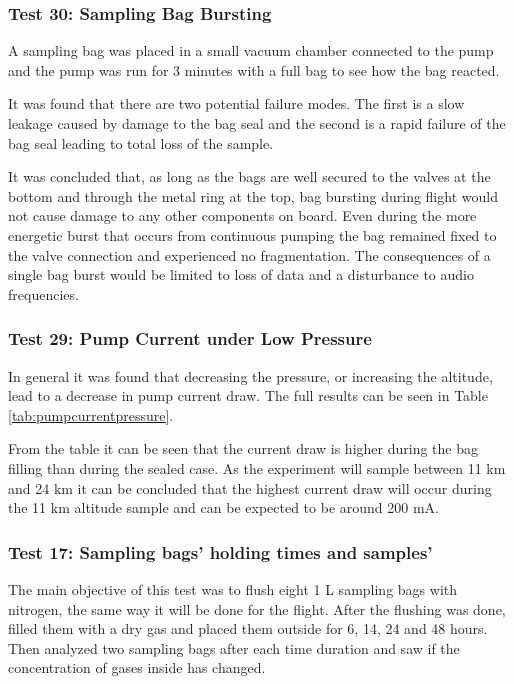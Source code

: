 \subsubsection{Test 30: Sampling Bag Bursting}
\label{sec:test30result}

A sampling bag was placed in a small vacuum chamber connected to the pump and the pump was run for 3 minutes with a full bag to see how the bag reacted. 

It was found that there are two potential failure modes. The first is a slow leakage caused by damage to the bag seal and the second is  a rapid failure of the bag seal leading to total loss of the sample.

It was concluded that, as long as the bags are well secured to the valves at the bottom and through the metal ring at the top, bag bursting during flight would not cause damage to any other components on board. Even during the more energetic burst that occurs from continuous pumping the bag remained fixed to the valve connection and experienced no fragmentation. The consequences of a single bag burst would be limited to loss of data and a disturbance to audio frequencies. 

\pagebreak
\subsubsection{Test 29: Pump Current under Low Pressure}
\label{sec:test29result}

In general it was found that decreasing the pressure, or increasing the altitude, lead to a decrease in pump current draw. The full results can be seen in Table \ref{tab:pumpcurrentpressure}. 



From the table it can be seen that the current draw is higher during the bag filling than during the sealed case. As the experiment will sample between 11 km and 24 km it can be concluded that the highest current draw will occur during the 11 km altitude sample and can be expected to be around 200 mA. 

\subsubsection{Test 17: Sampling bags' holding times and samples'}
\label{sec:test17result}

The main objective of this test was to flush eight 1 L sampling bags with nitrogen, the same way it will be done for the flight. After the flushing was done, filled them with a dry gas and placed them outside for 6, 14, 24 and 48 hours. Then analyzed two sampling bags after each time duration and saw if the concentration of gases inside has changed. 

